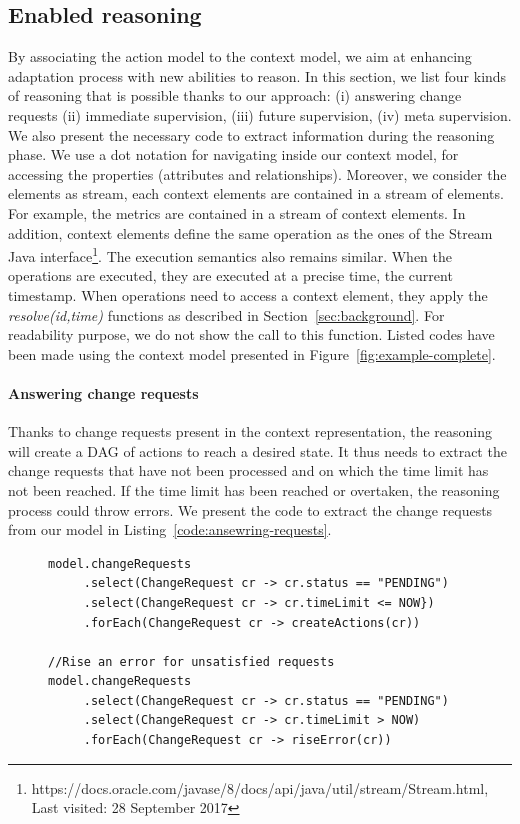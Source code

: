 \subsection{Enabled reasoning} 

By associating the action model to the context model, we aim at enhancing adaptation process with new abilities to reason.
In this section, we list four kinds of reasoning that is possible thanks to our approach: (i) answering change requests (ii) immediate supervision, (iii) future supervision, (iv) meta supervision.
We also present the necessary code to extract information during the reasoning phase.
We use a dot notation for navigating inside our context model, \ie for accessing the properties (attributes and relationships).
Moreover, we consider the elements as stream, \ie each context elements are contained in a stream of elements.
For example, the metrics are contained in a stream of context elements. 
In addition, context elements define the same operation as the ones of the Stream Java interface\footnote{https://docs.oracle.com/javase/8/docs/api/java/util/stream/Stream.html, Last visited: 28 September 2017}.
The execution semantics also remains similar.
When the operations are executed, they are executed at a precise time, \ie the current timestamp.
When operations need to access a context element, they apply the \textit{resolve(id,time)} functions as described in Section~\ref{sec:background}.
For readability purpose, we do not show the call to this function.
Listed codes have been made using the context model presented in Figure~\ref{fig:example-complete}.


\paragraph{Answering change requests}
Thanks to change requests present in the context representation, the reasoning will create a DAG of actions to reach a desired state.
It thus needs to extract the change requests that have not been processed and on which the time limit has not been reached. 
If the time limit has been reached or overtaken, the reasoning process could throw errors.
We present the code to extract the change requests from our model in Listing~\ref{code:ansewring-requests}.

\begin{figure}
\begin{lstlisting}[style=customc,caption=Generation of the DAG of actions from the change requested,label=code:ansewring-requests,basicstyle=\scriptsize]
model.changeRequests
     .select(ChangeRequest cr -> cr.status == "PENDING")
     .select(ChangeRequest cr -> cr.timeLimit <= NOW})
     .forEach(ChangeRequest cr -> createActions(cr))
 
//Rise an error for unsatisfied requests
model.changeRequests
     .select(ChangeRequest cr -> cr.status == "PENDING")
     .select(ChangeRequest cr -> cr.timeLimit > NOW)
     .forEach(ChangeRequest cr -> riseError(cr))
\end{lstlisting}
\end{figure}


